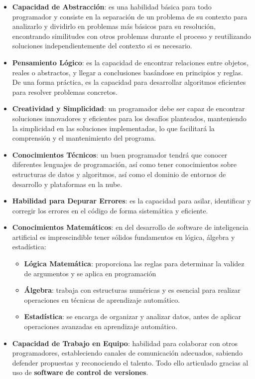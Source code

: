 \begin{itemize}
	\item \textbf{Capacidad de Abstracción}: es una habilidad básica para todo programador y consiste en la separación de un problema de su contexto para analizarlo y dividirlo en problemas más básicos para su resolución, encontrando similitudes con otros problemas durante el proceso y reutilizando soluciones independientemente del contexto si es necesario.
	
	\item \textbf{Pensamiento Lógico}: es la capacidad de encontrar relaciones entre objetos, reales o abstractos, y llegar a conclusiones basándose en principios y reglas. De una forma práctica, es la capacidad para desarrollar algoritmos eficientes para resolver problemas concretos.
	
	\item \textbf{Creatividad y Simplicidad}: un programador debe ser capaz de encontrar soluciones innovadores y eficientes para los desafíos planteados, manteniendo la simplicidad en las soluciones implementadas, lo que facilitará la comprensión y el mantenimiento del programa.
	
	\item \textbf{Conocimientos Técnicos}: un buen programador tendrá que conocer diferentes lenguajes de programación, así como tener conocimientos sobre estructuras de datos y algoritmos, así como el dominio de entornos de desarrollo y plataformas en la nube.
	
	\item \textbf{Habilidad para Depurar Errores}: es la capacidad para asilar, identificar y corregir los errores en el código de forma sistemática y eficiente.
	
	\item \textbf{Conocimientos Matemáticos}: en del desarrollo de software de inteligencia artificial es imprescindible tener sólidos fundamentos en lógica, álgebra y estadística:
	\begin{itemize}
		\item \textbf{Lógica Matemática}: proporciona las reglas para determinar la validez de argumentos y se aplica en programación
		\item \textbf{Álgebra}: trabaja con estructuras numéricas y es esencial para realizar operaciones en técnicas de aprendizaje automático.
		\item \textbf{Estadística}: se encarga de organizar y analizar datos, antes de aplicar operaciones avanzadas en aprendizaje automático. 
	\end{itemize}
	
	\item \textbf{Capacidad de Trabajo en Equipo}: habilidad para colaborar con otros programadores, estableciendo canales de comunicación adecuados, sabiendo defender propuestas y reconociendo el talento. Todo ello articulado gracias al uso de \textbf{software de control de versiones}.
\end{itemize} 

